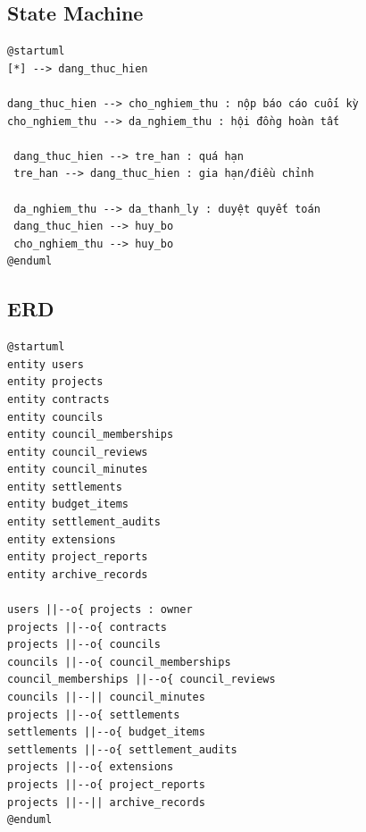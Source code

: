 \documentclass[12pt,a4paper]{report}
\begin{document}
\subsection{State Machine}
\begin{verbatim}
@startuml
[*] --> dang_thuc_hien

dang_thuc_hien --> cho_nghiem_thu : nộp báo cáo cuối kỳ
cho_nghiem_thu --> da_nghiem_thu : hội đồng hoàn tất

 dang_thuc_hien --> tre_han : quá hạn
 tre_han --> dang_thuc_hien : gia hạn/điều chỉnh

 da_nghiem_thu --> da_thanh_ly : duyệt quyết toán
 dang_thuc_hien --> huy_bo
 cho_nghiem_thu --> huy_bo
@enduml
\end{verbatim}

\subsection{ERD}
\begin{verbatim}
@startuml
entity users
entity projects
entity contracts
entity councils
entity council_memberships
entity council_reviews
entity council_minutes
entity settlements
entity budget_items
entity settlement_audits
entity extensions
entity project_reports
entity archive_records

users ||--o{ projects : owner
projects ||--o{ contracts
projects ||--o{ councils
councils ||--o{ council_memberships
council_memberships ||--o{ council_reviews
councils ||--|| council_minutes
projects ||--o{ settlements
settlements ||--o{ budget_items
settlements ||--o{ settlement_audits
projects ||--o{ extensions
projects ||--o{ project_reports
projects ||--|| archive_records
@enduml
\end{verbatim}
\end{document}
